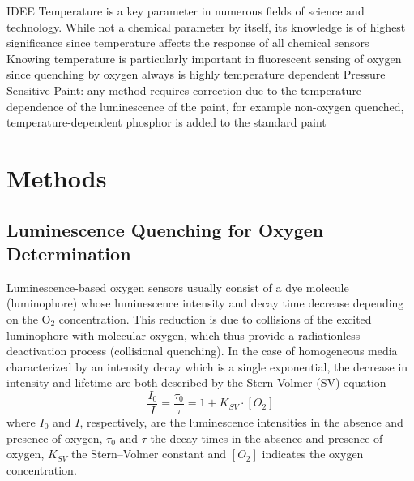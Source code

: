 \documentclass[9pt,twocolumn,twoside,pdftex]{optica}
\begin{document}
IDEE
Temperature is a key parameter in numerous fields of science and technology. While not a chemical parameter by itself, its knowledge is of highest significance since temperature affects the response of all chemical sensors
Knowing temperature is particularly important in fluorescent sensing of oxygen since quenching by oxygen always is highly temperature dependent
Pressure Sensitive Paint: any method requires correction due to the temperature dependence of the luminescence of the paint, for example non-oxygen quenched,  temperature-dependent  phosphor  is  added  to  the  standard  paint

\section{Methods}
\label{sec:methods}

\subsection{Luminescence Quenching for Oxygen Determination}
\label{Theory}

Luminescence-based oxygen sensors usually consist of a dye molecule (luminophore) whose luminescence intensity and decay time decrease depending on the O$_2$ concentration. This reduction is due to collisions of the excited luminophore with molecular oxygen, which thus provide a radiationless deactivation process (collisional quenching). 
In the case of homogeneous media characterized by an intensity decay which is a single exponential, the decrease in intensity and lifetime are both described by the Stern-Volmer (SV) equation \cite{Lakowicz2006}
\begin{equation}
\frac{I_0}{I}=\frac{\tau_0}{\tau}=1+K_{SV} \cdot \left[O_2\right]
\label{SVe}
\end{equation}
where $I_0$ and $I$, respectively, are the luminescence intensities in the absence and presence of oxygen, $\tau_0$ and $\tau$ the decay times in the absence and presence of oxygen, $K_{SV}$ the Stern–Volmer constant and $\left[O_2\right]$ indicates the oxygen concentration.
\end{document}
